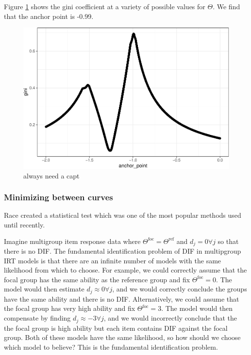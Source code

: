 \documentclass[
  11pt,
]{article}
\begin{document}
Figure \ref{fig:workplease} shows the gini coefficient at a variety of possible values for \(\Theta\). We find that the anchor point is -0.99.

\begin{figure}[H]

{\centering \includegraphics[width=0.7\linewidth]{paper_files/figure-latex/workplease-1} 

}

\caption{always need a capt}\label{fig:workplease}
\end{figure}

\hypertarget{minimizing-between-curves}{%
\subsubsection{Minimizing between curves}\label{minimizing-between-curves}}

Race created a statistical test which was one of the most popular methods used until recently.

Imagine multigroup item response data where \(\Theta^{\text{foc}} = \Theta^{\text{ref}}\) and \(d_j = 0 \forall j\) so that there is no DIF. The fundamental identification problem of DIF in multipgroup IRT models is that
there are an infinite number of models with the same likelihood from which to choose. For example, we could correctly assume that the focal group has the same ability as the reference group and fix \(\Theta^{\text{foc}} = 0\). The model would then estimate \(d_j \approx 0 \forall j\), and we would correctly conclude the groups have the same ability and there is no DIF. Alternatively, we could assume that the focal group has very high ability and fix \(\Theta^{\text{foc}} = 3\). The model would then compensate by finding \(d_j \approx -3 \forall j\), and we would incorrectly conclude that the the focal group is high ability but each item contains DIF against the focal group. Both of these models have the same likelihood, so how should we choose which model to believe? This is the fundamental identification problem.
\end{document}
